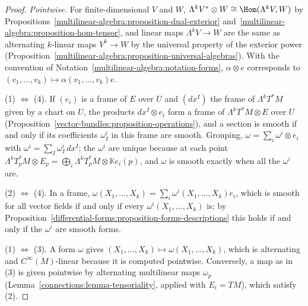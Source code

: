 \begin{proof}
\emph{Pointwise.} For finite-dimensional $V$ and $W$, $\Lambda^kV^* \otimes W \cong \Hom(\Lambda^kV, W)$ by Propositions~\ref{multilinear-algebra:proposition-dual-exterior}
and~\ref{multilinear-algebra:proposition-hom-tensor}, and linear maps $\Lambda^kV \to W$ are the same as alternating $k$-linear maps $V^k \to W$ by the universal property of
the exterior power (Proposition~\ref{multilinear-algebra:proposition-universal-algebras}). With the convention of Notation~\ref{multilinear-algebra:notation-forms}, $\alpha \otimes e$
corresponds to $(v_1, \ldots, v_k) \mapsto \alpha(v_1, \ldots, v_k)e$.

(1) $\Leftrightarrow$ (4). If $(e_i)$ is a frame of $E$ over $U$ and $(dx^I)$ the frame of $\Lambda^kT^*M$ given by a chart on $U$, the products $dx^I \otimes e_i$ form a frame
of $\Lambda^kT^*M \otimes E$ over $U$ (Proposition~\ref{vector-bundles:proposition-operations}), and a section is smooth if and only if its coefficients $\omega^i_I$ in this frame are smooth.
Grouping, $\omega = \sum_i\omega^i \otimes e_i$ with $\omega^i = \sum_I\omega^i_I\,dx^I$; the $\omega^i$ are unique because at each point
$\Lambda^kT_p^*M \otimes E_p = \bigoplus_i\Lambda^kT_p^*M \otimes \mathbb{K}e_i(p)$, and $\omega$ is smooth exactly when all the $\omega^i$ are.

(2) $\Leftrightarrow$ (4). In a frame, $\omega(X_1, \ldots, X_k) = \sum_i\omega^i(X_1, \ldots, X_k)e_i$, which is smooth for all vector fields if and only if every
$\omega^i(X_1, \ldots, X_k)$ is; by Proposition~\ref{differential-forms:proposition-forms-descriptions} this holds if and only if the $\omega^i$ are smooth forms.

(1) $\Leftrightarrow$ (3). A form $\omega$ gives $(X_1, \ldots, X_k) \mapsto \omega(X_1, \ldots, X_k)$, which is alternating and $C^\infty(M)$-linear because it is computed
pointwise. Conversely, a map as in (3) is given pointwise by alternating multilinear maps $\omega_p$ (Lemma~\ref{connections:lemma-tensoriality}, applied with $E_i = TM$),
which satisfy (2).
\end{proof}

